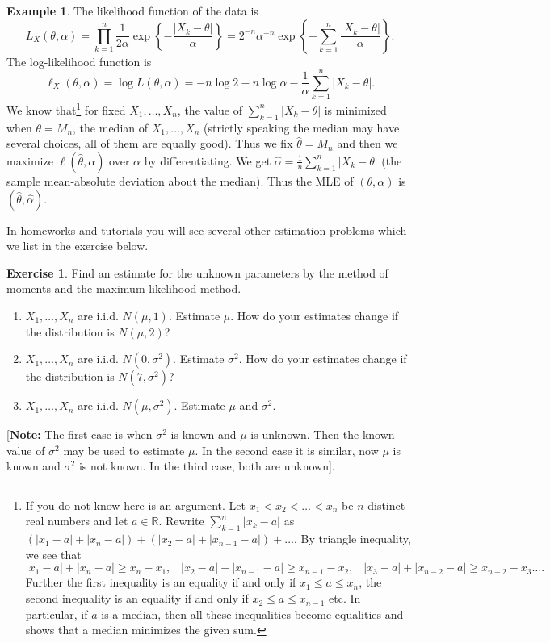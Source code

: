 \documentclass[preprint,  11pt]{amsart}
\newcommand{\para}[1]{\vspace{4mm}\noindent{\bfseries #1:}}
\theoremstyle{plain} %
\theoremstyle{definition} %
\newtheorem{exercise}[theorem]{Exercise}
\newtheorem{example}[theorem]{Example}
\begin{document}
\begin{example}
\para{Maximum likelihood method} The likelihood function of the data is
$$
L_{X}(\theta,\alpha)=\prod\limits_{k=1}^{n}\frac{1}{2\alpha}\exp\left\{-\frac{|X_{k}-\theta|}{\alpha}\right\}= 2^{-n}\alpha^{-n}\exp\left\{-\sum_{k=1}^{n}\frac{|X_{k}-\theta|}{\alpha}\right\}.
$$
The log-likelihood function is $$\ell_{X}(\theta,\alpha)=\log L(\theta,\alpha)=-n\log 2 - n\log \alpha -\frac{1}{\alpha}\sum_{k=1}^{n}|X_{k}-\theta|.$$ We know that\footnote{If you do not know here is an argument. Let $x_{1}<x_{2}<\ldots <x_{n}$ be $n$ distinct real numbers and let $a\in \mathbb{R}$. Rewrite $\sum_{k=1}^{n}|x_{k}-a|$ as $(|x_{1}-a|+|x_{n}-a|)+(|x_{2}-a|+|x_{n-1}-a|)+\ldots$. By triangle inequality, we see that $$|x_{1}-a|+|x_{n}-a|\ge x_{n}-x_{1}, \;\;\; |x_{2}-a|+|x_{n-1}-a|\ge x_{n-1}-x_{2}, \;\;\; |x_{3}-a|+|x_{n-2}-a|\ge x_{n-2}-x_{3}\ldots.
$$
Further the first inequality is an equality if and only if $x_{1}\le a\le x_{n}$, the second inequality is an equality if and only if $x_{2}\le a\le x_{n-1}$ etc. In particular, if $a$ is a median, then all these inequalities become equalities and shows that a median minimizes the given sum.
} for fixed $X_{1},\ldots ,X_{n}$, the value of $\sum_{k=1}^{n}|X_{k}-\theta|$ is minimized when $\theta=M_{n}$, the median of $X_{1},\ldots ,X_{n}$ (strictly speaking the median may have several choices, all of them are equally good). Thus we fix $\hat{\theta}=M_{n}$ and then we maximize $\ell(\hat{\theta},\alpha)$ over $\alpha$ by differentiating. We get $\hat{\alpha}=\frac{1}{n}\sum_{k=1}^{n}|X_{k}-\theta|$ (the sample mean-absolute deviation about the median). Thus the MLE of $(\theta,\alpha)$ is $(\hat{\theta},\hat{\alpha})$.
\end{example}

In homeworks and tutorials you will see several other estimation problems which we list in the exercise below.
\begin{exercise} Find an estimate for the unknown parameters by the method of moments and the maximum likelihood method.
 \begin{enumerate}\setlength\itemsep{6pt}
\item $X_{1},\ldots, X_{n}$ are i.i.d. $N(\mu,1)$. Estimate $\mu$. How do your estimates change if the distribution is $N(\mu,2)$?
\item $X_{1},\ldots, X_{n}$ are i.i.d. $N(0,{\sigma}^{2})$. Estimate ${\sigma}^{2}$. How do your estimates change if the distribution is $N(7,{\sigma}^{2})$?
\item $X_{1},\ldots, X_{n}$ are i.i.d. $N(\mu,{\sigma}^{2})$. Estimate $\mu$ and ${\sigma}^{2}$.
\end{enumerate}
[{\bf Note:} The first case is when ${\sigma}^{2}$ is known and $\mu$ is unknown. Then the known value of ${\sigma}^{2}$ may be used to estimate $\mu$. In the second case it is similar, now $\mu$ is known and ${\sigma}^{2}$ is not known. In the third case, both are unknown].
\end{exercise}
\end{document}
